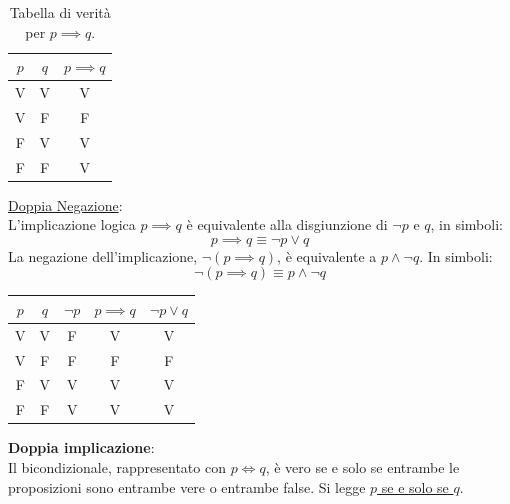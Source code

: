 \begin{enumerate}
                \begin{table}[h!]
                    \centering
                    \begin{tabular}{|c|c|c|}
                        \hline
                        $p$ & $q$ & $p \implies q$ \\
                        \hline
                        V & V & V \\
                        V & F & F \\
                        F & V & V \\
                        F & F & V \\
                        \hline
                    \end{tabular}
                    \caption{Tabella di verità per \( p \implies q \).}
                \end{table}
            
        \end{enumerate} \newpage
    
        \vspace{1em} 
        \underline{Doppia Negazione}: \\
        L'implicazione logica \( p \implies q \) è equivalente alla disgiunzione di \( \neg p \) e \( q \), in simboli:
        \[
        p \implies q \equiv \neg p \lor q
        \]
        La negazione dell'implicazione, \( \neg (p \implies q) \), è equivalente a \( p \land \neg q \). In simboli:
        \[
        \neg (p \implies q) \equiv p \land \neg q
        \]
    
        \begin{table}[h!]
            \centering
            \begin{tabular}{|c|c|c|c|c|}
                \hline
                $p$ & $q$ & $\neg p$ & $p \implies q$ & $\neg p \lor q$ \\
                \hline
                V & V & F & V & V \\
                V & F & F & F & F \\
                F & V & V & V & V \\
                F & F & V & V & V \\
                \hline
            \end{tabular}
        \end{table}
                                                           
                                                           
        \textbf{Doppia implicazione}:    \\
         Il bicondizionale, rappresentato con \( p \iff q \), è vero se e solo se entrambe le proposizioni sono entrambe vere o entrambe false. Si legge \underline{\( p \) se e solo se \( q \)}.
        
